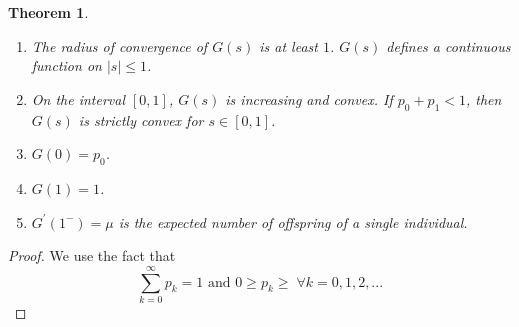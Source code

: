 \documentclass{article}
\newtheorem{theorem}{Theorem}[section]
\theoremstyle{remark}
\theoremstyle{definition}
\begin{document}
\begin{theorem}
\begin{enumerate}
    \item The radius of convergence of $G(s)$ is at least $1$. $G(s)$ defines a continuous function on $|s| \leq 1$. 
    \item On the interval $[0,1]$, $G(s)$ is increasing and convex. If $p_0 + p_1 < 1$, then $G(s)$ is strictly convex for $s \in [0,1]$. 
    \item $G(0) = p_0$. 
    \item $G(1) = 1$. 
    \item $G^\prime(1^-) = \mu$ is the expected number of offspring of a single individual. 
\end{enumerate}
\end{theorem}
\begin{proof}
We use the fact that 
\[\sum_{k=0}^\infty p_k = 1 \text{ and } 0 \geq p_k \geq \; \forall k = 0, 1, 2, ...\]
\end{proof}
\end{document}
